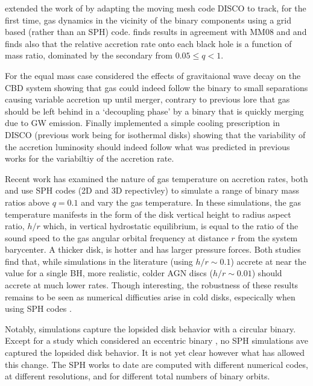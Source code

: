 \citep{Farris} extended the work of \citep{DHM:2013:MNRAS} by adapting the
moving mesh code DISCO \citep{DuffellMacFadyenDISCO:2013,
DuffellMHDDISCO:2016} to track, for the first time, gas dynamics in the
vicinity of the binary components using a grid based (rather than an SPH)
code. \citep{Farris:2014} finds results in agreement with MM08 and
\citep{DHM:2013:MNRAS} and finds also that the relative accretion rate onto
each black hole is a function of mass ratio, dominated by the secondary from
$0.05 \leq q < 1$. 


For the equal mass case \citep{Farris:2015:GW} considered
the effects of gravitaional wave decay on the CBD system showing that gas
could indeed follow the binary to small separations causing variable accretion
up until merger, contrary to previous lore that gas should be left behind in a
`decoupling phase' by a binary that is quickly merging due to GW emission.
Finally \citep{Farris:2015:Cool} implemented a simple cooling prescription in
DISCO (previous work being for isothermal disks) showing that the variability
of the accretion luminosity should indeed follow what was predicted in
previous works for the variabiltiy of the accretion rate.



Recent work has examined the nature of gas temperature on accretion rates,
both \cite{YoungClarke:2015} and \cite{RagusaLodato:2016} use SPH codes (2D
and 3D repectivley) to simulate a range of binary mass ratios above $q=0.1$
and vary the gas temperature. In these simulations, the gas temperature
manifests in the form of the disk vertical height to radius aspect ratio,
$h/r$ which, in vertical hydrostatic equilibrium, is equal to the ratio of the
sound speed to the gas angular orbital frequency at distance $r$ from the
system barycenter. A thicker disk, is hotter and has larger pressure forces.
Both studies find that, while simulations in the literature (using $h/r \sim
0.1$) accrete at near the value for a single BH, more realistic, colder AGN
discs ($h/r \sim 0.01$) should accrete at much lower rates. Though
interesting, the robustness of these results remains to be seen as numerical
difficuties arise in cold disks, especically when using SPH codes \citep{}.


Notably, \citep{RagusaLodato:2016} simulations capture the lopsided disk
behavior with a circular binary. Except for a study which considered an
eccentric binary \citep{Dunhill:2012}, no SPH simulations ave captured the
lopsided disk behavior. It is not yet clear however what has allowed this
change. The SPH works to date are computed with different numerical codes, at
different resolutions, and for different total numbers of binary orbits.


